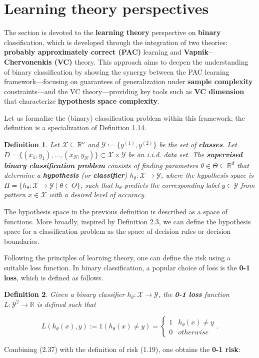 \documentclass{report}
\newtheorem{definition}{Definition}[chapter]
\begin{document}
\section{Learning theory perspectives}
The section is devoted to the \textbf{learning theory} perspective on \textbf{binary} classification, which is developed through the integration of two theories: \textbf{probably approximately correct (PAC)} learning and \textbf{Vapnik–Chervonenkis (VC)} theory. This approach aims to deepen the understanding of binary classification by showing the synergy between the PAC learning framework—focusing on guarantees of generalization under \textbf{sample complexity} constraints—and the VC theory—providing key tools such as \textbf{VC dimension} that characterize \textbf{hypothesis space complexity}.

Let us formalize the (binary) classification problem within this framework; the definition is a specialization of Definition 1.14.

\begin{definition}
Let $\mathcal{X} \subseteq \mathbb{R}^n$ and $\mathcal{Y} := \{y^{(1)}, y^{(2)}\}$ be the set of \textbf{classes}. Let $D = \{(x_1,y_1), \dots, (x_N,y_N)\} \subset \mathcal{X} \times \mathcal{Y}$ be an i.i.d. data set. The \textbf{supervised binary classification problem} consists of finding parameters $\theta \in \Theta \subseteq \mathbb{R}^d$ that determine a \textbf{hypothesis} (or \textbf{classifier}) $h_\theta : \mathcal{X} \to \mathcal{Y}$, where the hypothesis space is $H = \{h_\theta : \mathcal{X} \to \mathcal{Y} \mid \theta \in \Theta\}$, such that $h_\theta$ predicts the corresponding label $y \in \mathcal{Y}$ from pattern $x \in \mathcal{X}$ with a desired level of accuracy.
\end{definition}
The hypothesis space in the previous definition is described as a space of functions. More broadly, inspired by Definition 2.3, we can define the hypothesis space for a classification problem as the space of decision rules or decision boundaries.

Following the principles of learning theory, one can define the risk using a suitable loss function. In binary classification, a popular choice of loss is the \textbf{0-1 loss}, which is defined as follows.

\begin{definition}
Given a binary classifier $h_\theta : \mathcal{X} \to \mathcal{Y}$, the \textbf{0-1 loss} function $L : \mathcal{Y} ^ 2 \to \mathbb{R}$ is defined such that

\begin{equation}
L(h_\theta(x), y) := 1(h_\theta(x) \neq y) = \left\{\begin{matrix}
1 &  h_\theta(x) \neq y \\
0 & otherwise
\end{matrix}\right..
\end{equation}
\end{definition}
Combining (2.37) with the definition of risk (1.19), one obtains the \textbf{0-1 risk}:
\end{document}
